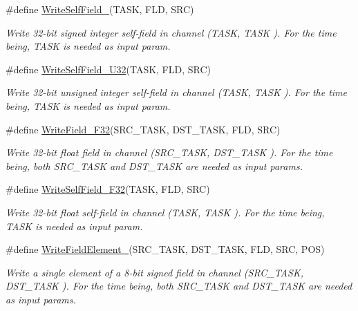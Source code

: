 \begin{DoxyCompactItemize}
\#define \hyperlink{group__interpow__read__write_ga481cc0dfd07e4ddc56f9622ac5601f66}{Write\+Self\+Field\+\_}(T\+A\+SK,  F\+LD,  S\+RC)
\begin{DoxyCompactList}\small\item\em Write 32-\/bit signed integer self-\/field in channel ({\itshape T\+A\+SK}, {\itshape T\+A\+SK} ). For the time being, T\+A\+SK is needed as input param. \end{DoxyCompactList}\item 
\#define \hyperlink{group__interpow__read__write_ga99ddf27f2c34b3d876d525597eb0d267}{Write\+Self\+Field\+\_\+\+U32}(T\+A\+SK,  F\+LD,  S\+RC)
\begin{DoxyCompactList}\small\item\em Write 32-\/bit unsigned integer self-\/field in channel ({\itshape T\+A\+SK}, {\itshape T\+A\+SK} ). For the time being, T\+A\+SK is needed as input param. \end{DoxyCompactList}\item 
\#define \hyperlink{group__interpow__read__write_ga455a59b971b82fcf001f46ac271e4301}{Write\+Field\+\_\+\+F32}(S\+R\+C\+\_\+\+T\+A\+SK,  D\+S\+T\+\_\+\+T\+A\+SK,  F\+LD,  S\+RC)
\begin{DoxyCompactList}\small\item\em Write 32-\/bit float field in channel ({\itshape S\+R\+C\+\_\+\+T\+A\+SK}, {\itshape D\+S\+T\+\_\+\+T\+A\+SK} ). For the time being, both S\+R\+C\+\_\+\+T\+A\+SK and D\+S\+T\+\_\+\+T\+A\+SK are needed as input params. \end{DoxyCompactList}\item 
\#define \hyperlink{group__interpow__read__write_gaec0f82acde1a6ba9d8740f49a28452ca}{Write\+Self\+Field\+\_\+\+F32}(T\+A\+SK,  F\+LD,  S\+RC)
\begin{DoxyCompactList}\small\item\em Write 32-\/bit float self-\/field in channel ({\itshape T\+A\+SK}, {\itshape T\+A\+SK} ). For the time being, T\+A\+SK is needed as input param. \end{DoxyCompactList}\item 
\#define \hyperlink{group__interpow__read__write_ga743f1dfe8811e082696e0cf3e2739e4b}{Write\+Field\+Element\+\_}(S\+R\+C\+\_\+\+T\+A\+SK,  D\+S\+T\+\_\+\+T\+A\+SK,  F\+LD,  S\+RC,  P\+OS)
\begin{DoxyCompactList}\small\item\em Write a single element of a 8-\/bit signed field in channel ({\itshape S\+R\+C\+\_\+\+T\+A\+SK}, {\itshape D\+S\+T\+\_\+\+T\+A\+SK} ). For the time being, both S\+R\+C\+\_\+\+T\+A\+SK and D\+S\+T\+\_\+\+T\+A\+SK are needed as input params. \end{DoxyCompactList}\item 

\end{DoxyCompactItemize}
